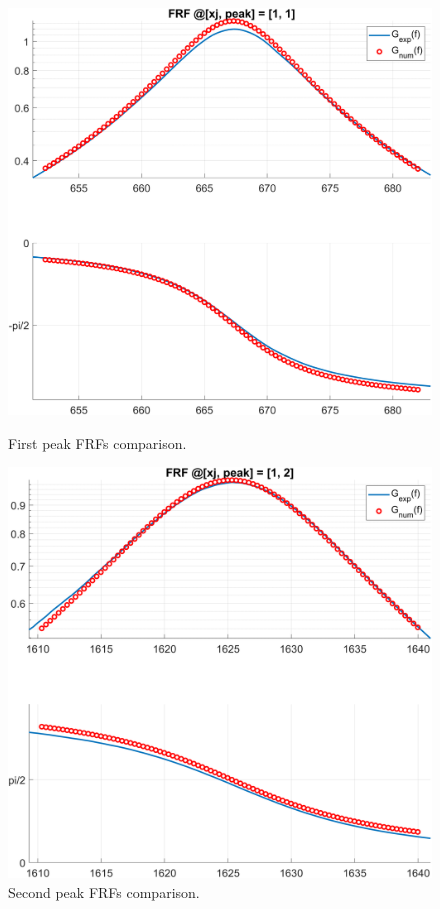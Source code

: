 \begin{figure}[H]
    \centering
    \begin{minipage}{0.45\textwidth}
        \centering
        \includegraphics[width=\textwidth]{img/MATLAB/Part_B/Comparison_FRF_1_zoom_peak_01.png}
        \caption{First peak FRFs comparison.}
        \label{fig:first_peak}
    \end{minipage}
    \hfill
    \begin{minipage}{0.45\textwidth}
        \centering
        \includegraphics[width=\textwidth]{img/MATLAB/Part_B/Comparison_FRF_1_zoom_peak_02.png}
        \caption{Second peak FRFs comparison.}
        \label{fig:second_peak}
    \end{minipage}
\end{figure}